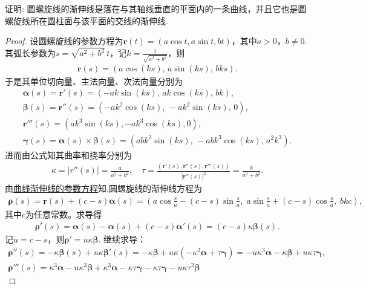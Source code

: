 \documentclass[../../main.tex]{subfiles}%
\begin{document}
\begin{example}
证明: 圆螺旋线的渐伸线是落在与其轴线垂直的平面内的一条曲线，并且它也是圆螺旋线所在圆柱面与该平面的交线的渐伸线.
\end{example}
\begin{proof}
设圆螺旋线的参数方程为$\bm{r}(t)=(a\cos t,a\sin t,bt)$，其中$a>0$，$b\neq 0$. 其弧长参数为$s=\sqrt{a^2+b^2}\,t$，记$k=\frac{1}{\sqrt{a^2+b^2}}$，则
\begin{align*}
\bm{r}(s)=\left(a\cos(ks),\,a\sin(ks),\,bks\right).
\end{align*}
于是其单位切向量、主法向量、次法向量分别为
\begin{gather*}
\bm{\alpha}(s)=\bm{r}'(s)=\left(-ak\sin(ks),\,ak\cos(ks),\,bk\right),\\
\bm{\beta}(s)=\bm{r}''(s)=\left(-ak^2\cos(ks),\,-ak^2\sin(ks),\,0\right),
\\
\bm{r}'''(s)=(ak^3\sin(ks),-ak^3\cos(ks),0),
\\
\bm{\gamma}(s)=\bm{\alpha}(s)\times\bm{\beta}(s)=\left(abk^3\sin(ks),\,-abk^3\cos(ks),\,a^2k^3\right).
\end{gather*}
进而由公式知其曲率和挠率分别为
\begin{align*}
\kappa = |r''(s)|=\frac{a}{a^2+b^2},
\quad \tau = \frac{\left( \boldsymbol{r}' \left( s \right) ,\boldsymbol{r}'' \left( s \right) ,\boldsymbol{r}''' \left( s \right) \right)}{\left| \boldsymbol{r}'' \left( s \right) \right|^2}=\frac{b}{a^2+b^2}.
\end{align*}
由\hyperref[theorem:微分几何-定理7.3]{曲线渐伸线的参数方程}知,圆螺旋线的渐伸线方程为
\begin{align}\label{eq::2jru3ju233jKJIJI}
\bm{\rho}(s)=\bm{r}(s)+(c-s)\bm{\alpha}(s)=\left( a\cos \frac{s}{a}-(c-s)\sin \frac{s}{a},\;a\sin \frac{s}{a}+(c-s)\cos \frac{s}{a},\;bkc \right),
\end{align}
其中$c$为任意常数。求导得
\begin{align*}
\bm{\rho}'(s)=\bm{\alpha}(s)-\bm{\alpha}(s)+(c-s)\bm{\alpha}'(s)=(c-s)\kappa\bm{\beta}(s).
\end{align*}
记$u=c-s$，则$\bm{\rho}'=u\kappa \bm{\beta}$. 继续求导：
\begin{gather*}
\bm{\rho}''(s)=-\kappa \bm{\beta}(s)+u\kappa \bm{\beta}'(s)=-\kappa \bm{\beta}+u\kappa (-\kappa^2\bm{\alpha}+\tau\bm{\gamma})=-u\kappa^3\bm{\alpha}-\kappa \bm{\beta}+u\kappa \tau\bm{\gamma},\\
\bm{\rho}'''(s)=\kappa^3\bm{\alpha}-u\kappa^3\bm{\beta}+\kappa^3\bm{\alpha}-\kappa\tau\bm{\gamma}-\kappa\tau\bm{\gamma}-u\kappa\tau^2\bm{\beta}

\end{gather*}
\end{proof}
\end{document}

